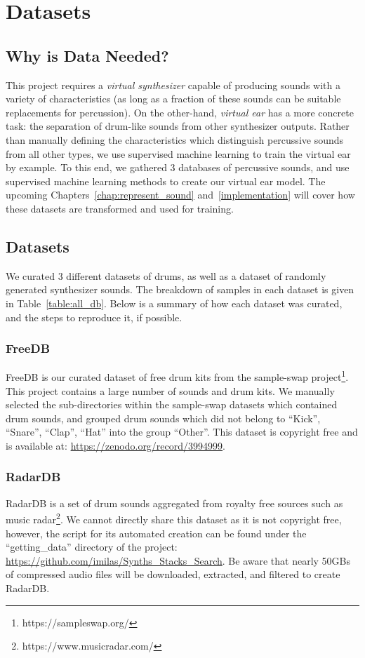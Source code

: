 \documentclass[\main/thesis.tex]{subfiles}
\begin{document}
\chapter{Datasets}
\label{sec:datasets}
\section{Why is Data Needed?}
This project requires a \textit{virtual synthesizer} capable of producing sounds with a variety of characteristics (as long as a fraction of these sounds can be suitable replacements for percussion). On the other-hand, \textit{virtual ear} has a more concrete task: the separation of drum-like sounds from other synthesizer outputs. Rather than manually defining the characteristics which distinguish percussive sounds from all other types, we use supervised machine learning to train the virtual ear by example. To this end, we gathered 3 databases of percussive sounds, and use supervised machine learning methods to create our virtual ear model. The upcoming Chapters~\ref{chap:represent_sound} and~\ref{implementation} will cover how these datasets are transformed and used for training.


\section{Datasets}
We curated 3 different datasets of drums, as well as a dataset of randomly generated synthesizer sounds.  The breakdown of samples in each dataset is given in Table~\ref{table:all_db}. Below is a summary of how each dataset was curated, and the steps to reproduce it, if possible. 
\subsection{FreeDB}
FreeDB is our curated dataset of free drum kits from the sample-swap project\footnote{https://sampleswap.org/}. This project contains  a large number of sounds and drum kits. We manually selected the sub-directories within the sample-swap datasets which contained drum sounds, and grouped drum sounds which did not belong to \enquote{Kick}, \enquote{Snare}, \enquote{Clap}, \enquote{Hat} into the group \enquote{Other}. This dataset is copyright free and is available at: \url{https://zenodo.org/record/3994999}. 
\subsection{RadarDB}
RadarDB is a set of drum sounds aggregated from royalty free sources such as music radar\footnote{https://www.musicradar.com/}. We cannot directly share this dataset as it is not copyright free, however, the script for its automated creation can be found under the \enquote{getting\_data} directory of the project: \url{https://github.com/imilas/Synths_Stacks_Search}. Be aware that nearly 50GBs of compressed audio files will be downloaded, extracted, and filtered to create RadarDB. 
\end{document}
